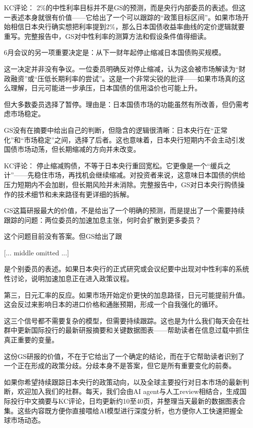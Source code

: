 \documentclass[11pt]{ctexart}
\begin{document}
KC评论： 2\%的中性利率目标并不是GS的预测，而是央行内部委员的表述。但这一表述本身就很有价值——它给出了一个可以跟踪的“政策目标区间”。如果市场开始相信日本央行确实想把利率提到2\%，那么日本国债收益率曲线的定价逻辑就要重写。完整报告中，GS对中性利率的测算方法和假设条件值得细读。

6月会议的另一项重要决定是：从下一财年起停止缩减日本国债购买规模。

这一决定并非没有争议。一位委员明确反对停止缩减，认为这会被市场解读为“财政融资”或“压低长期利率的尝试”。这是一个非常尖锐的批评——如果市场真的这么理解，日元可能进一步承压，日本国债的信用溢价也可能上升。

但大多数委员选择了暂停。理由是：日本国债市场的功能虽然有所改善，但仍需考虑市场稳定。

GS没有在摘要中给出自己的判断，但隐含的逻辑很清晰：日本央行在“正常化”和“市场稳定”之间，选择了后者。这也意味着，日本央行短期内不会主动引发国债市场动荡，但长期缩减的方向并未改变。

KC评论： 停止缩减购债，不等于日本央行重回宽松。它更像是一个“缓兵之计”——先稳住市场，再找机会继续缩减。对投资者来说，这意味日本国债的供给压力短期内不会加剧，但长期风险并未消除。完整报告中，GS对日本央行购债操作的技术细节和未来路径有更详细的拆解。

GS这篇研报最大的价值，不是给出了一个明确的预测，而是提出了一个需要持续跟踪的问题：两位委员的加速加息主张，何时会扩散到更多委员？

这个问题目前没有答案。但GS给出了跟

[... middle omitted ...]

是个别委员的表述。如果日本央行的正式研究或会议纪要中出现对中性利率的系统性讨论，说明加速加息正在进入政策议程。

第三，日元汇率的反应。如果市场开始定价更快的加息路径，日元可能提前升值。这会反过来影响日本的进口价格和通胀预期，形成一个自我强化的循环。

这三个信号都不需要复杂的模型，但需要持续跟踪。这也是为什么我们每天会在社群中更新国际投行的最新研报摘要和关键数据图表——帮助读者在信息过载中抓住真正重要的变量。

这份GS研报的价值，不在于它给出了一个确定的结论，而在于它帮助读者识别了一个正在形成的政策分歧。分歧本身不是答案，但它是所有重要变化的前奏。

如果你希望持续跟踪日本央行的政策动向，以及全球主要投行对日本市场的最新判断，欢迎加入我们的社群。每天，我们会由AI agent与人工review相结合，生成国际投行中文摘要与KC评论，日均更新约10至40页，并整理当天最新的数据图表合集。这些内容既方便你直接喂给AI模型进行深度分析，也方便你人工快速把握全球市场动态。
\end{document}
